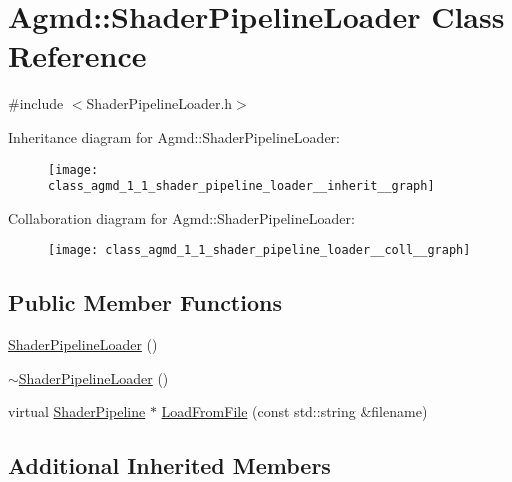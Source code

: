 \hypertarget{class_agmd_1_1_shader_pipeline_loader}{\section{Agmd\+:\+:Shader\+Pipeline\+Loader Class Reference}
\label{class_agmd_1_1_shader_pipeline_loader}
}


{\ttfamily \#include $<$Shader\+Pipeline\+Loader.\+h$>$}



Inheritance diagram for Agmd\+:\+:Shader\+Pipeline\+Loader\+:\nopagebreak
\begin{figure}[H]
\begin{center}
\leavevmode
\texttt{[image: class\_agmd\_1\_1\_shader\_pipeline\_loader\_\_inherit\_\_graph]}
\end{center}
\end{figure}


Collaboration diagram for Agmd\+:\+:Shader\+Pipeline\+Loader\+:\nopagebreak
\begin{figure}[H]
\begin{center}
\leavevmode
\texttt{[image: class\_agmd\_1\_1\_shader\_pipeline\_loader\_\_coll\_\_graph]}
\end{center}
\end{figure}
\subsection*{Public Member Functions}
\begin{DoxyCompactItemize}
\item 
\hyperlink{class_agmd_1_1_shader_pipeline_loader_ae4b22c4ac387390341f9e2cff7ff4da5}{Shader\+Pipeline\+Loader} ()
\item 
\hyperlink{class_agmd_1_1_shader_pipeline_loader_abb4ef5fb728bf9fdbd866536fa56c938}{$\sim$\+Shader\+Pipeline\+Loader} ()
\item 
virtual \hyperlink{class_agmd_1_1_shader_pipeline}{Shader\+Pipeline} $\ast$ \hyperlink{class_agmd_1_1_shader_pipeline_loader_a246cb263a2b7396ac8ce2d60ff81b065}{Load\+From\+File} (const std\+::string \&filename)
\end{DoxyCompactItemize}
\subsection*{Additional Inherited Members}


